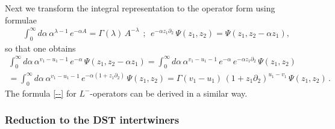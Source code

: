\documentclass[11pt]{article}
\numberwithin{equation}{section}
\theoremstyle{plain}
\theoremstyle{definition}
\def\dd{\partial}
\begin{document}
Next we transform the integral representation 
to the operator form using formulae 
\begin{align*}
	\int_{0}^{\infty} d\alpha\,\alpha^{\lambda-1} 
	\,e^{-\alpha A} = \Gamma(\lambda)\,A^{-\lambda} \ \ ;\ \ e^{-\alpha z_1\partial_2}
	\,\Psi(z_1,z_2) = \Psi(z_1,z_2 - \alpha z_1),
\end{align*}
so that one obtains
\begin{multline*}
	\int_{0}^{\infty} d\alpha\,\alpha^{v_1-u_1-1} \,e^{-\alpha}
	\,\Psi(z_1,z_2 - \alpha z_1) =
	\int_{0}^{\infty} d\alpha\,\alpha^{v_1-u_1-1} 
	\,e^{-\alpha}\,e^{-\alpha z_1\partial_2}
	\,\Psi(z_1,z_2) \\ 
	= \int_{0}^{\infty} d\alpha\,\alpha^{v_1-u_1-1} 
	\,e^{-\alpha(1+z_1\partial_2)}\,\Psi(z_1,z_2) = 
	\Gamma(v_1-u_1)\,(1+z_{1} \dd_{2})^{u_1-v_1}\,\Psi(z_1,z_2)\,.
\end{multline*}
The formula \eqref{--} for $L^{-}$-operators 
can be derived in a similar way. 

\subsubsection{Reduction to the DST intertwiners}
\end{document}

